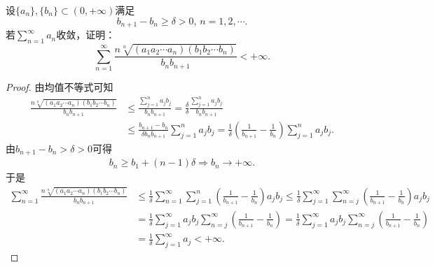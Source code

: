 \documentclass[../../main.tex]{subfiles}%
\begin{document}
\begin{example}
设$\{a_n\},\{b_n\} \subset (0,+\infty)$满足
\[ b_{n + 1} - b_n \geqslant \delta > 0, \, n = 1,2,\cdots. \]
若$\sum_{n = 1}^{\infty} a_n$收敛，证明：
\[ \sum_{n = 1}^{\infty} \frac{n\sqrt[n]{(a_1 a_2 \cdots a_n)(b_1 b_2 \cdots b_n)}}{b_n b_{n + 1}} < +\infty. \]
\end{example}
\begin{proof}

由均值不等式可知
\begin{align*}
\frac{n\sqrt[n]{(a_1a_2\cdots a_n)(b_1b_2\cdots b_n)}}{b_nb_{n+1}}&\leqslant \frac{\sum\limits_{j=1}^n{a_jb_j}}{b_nb_{n+1}}=\frac{\delta}{\delta}\frac{\sum\limits_{j=1}^n{a_jb_j}}{b_nb_{n+1}} \\
&\leqslant \frac{b_{n+1}-b_n}{\delta b_nb_{n+1}}\sum_{j=1}^n{a_jb_j}=\frac{1}{\delta}\left( \frac{1}{b_{n+1}}-\frac{1}{b_n} \right) \sum_{j=1}^n{a_jb_j}.
\end{align*}
由$b_{n+1}-b_n>\delta >0$可得
\begin{align*}
b_n\geqslant b_1+\left( n-1 \right) \delta \Longrightarrow b_n\rightarrow +\infty .
\end{align*}
于是
\begin{align*}
\sum_{n=1}^{\infty}{\frac{n\sqrt[n]{(a_1a_2\cdots a_n)(b_1b_2\cdots b_n)}}{b_nb_{n+1}}}&\leqslant \frac{1}{\delta}\sum_{n=1}^{\infty}{\sum_{j=1}^n{\left( \frac{1}{b_{n+1}}-\frac{1}{b_n} \right) a_jb_j}}\leqslant \frac{1}{\delta}\sum_{j=1}^{\infty}{\sum_{n=j}^{\infty}{\left( \frac{1}{b_{n+1}}-\frac{1}{b_n} \right) a_jb_j}}
\\
&=\frac{1}{\delta}\sum_{j=1}^{\infty}{a_jb_j\sum_{n=j}^{\infty}{\left( \frac{1}{b_{n+1}}-\frac{1}{b_n} \right)}}=\frac{1}{\delta}\sum_{j=1}^{\infty}{a_jb_j\sum_{n=j}^{\infty}{\left( \frac{1}{b_{n+1}}-\frac{1}{b_n} \right)}}
\\
&=\frac{1}{\delta}\sum_{j=1}^{\infty}{a_j}<+\infty .
\end{align*}

\end{proof}
\end{document}
